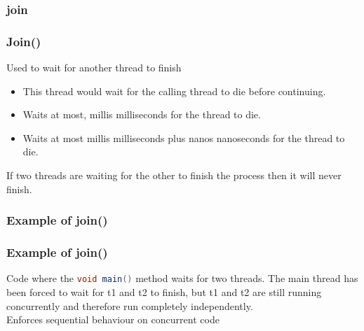 \documentclass{beamer}
\begin{document}
\subsubsection{join}
\begin{frame}[fragile]
\frametitle{Join()}
\Large{Used to wait for another thread to finish}
\join
\begin{itemize}
\item This thread would wait for the calling thread to die before continuing.
\joinTwo
\item Waits at most, millis milliseconds for the thread to die.
\joinThree
\item Waits at most millis milliseconds plus nanos nanoseconds for the thread to die.
\end{itemize}
If two threads are waiting for the other to finish the process then it will never finish.
\end{frame}

\subsubsection{Example of join()}
\begin{frame}
\frametitle{Example of join()}
Code where the \lstinline[language=Java,basicstyle=\ttfamily,keywordstyle=\color{blue}]{void main()} method waits for two threads.
\joinExample
The {\color{orange}main} thread has been forced to wait for {\color{red} t1} and {\color{green} t2} to finish, but {\color{red} t1} and {\color{green} t2} are still running {\color{blue} concurrently} and therefore run completely independently. \\
Enforces {\color{purple} sequential} behaviour on {\color{blue} concurrent} code
\end{frame}
\end{document}
